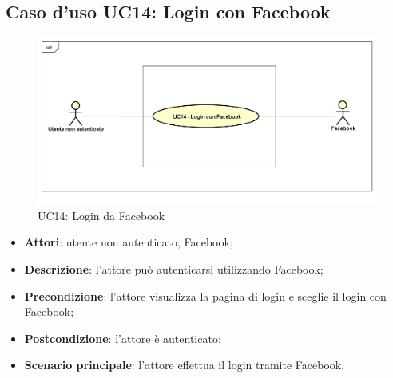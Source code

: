 \newpage
\subsection{Caso d'uso UC14: Login con Facebook}
\label{UC14}
\begin{figure}
	\centering
	\includegraphics[scale=0.48]{UML/UC14.png}
	\caption{UC14: Login da Facebook}
\end{figure}
\FloatBarrier
\begin{itemize}
	\item \textbf{Attori}: utente non autenticato, Facebook;
	\item \textbf{Descrizione}: l'attore può autenticarsi utilizzando Facebook;
	\item \textbf{Precondizione}: l'attore visualizza la pagina di login e sceglie il login con Facebook;
	\item \textbf{Postcondizione}: l'attore è autenticato;
	\item \textbf{Scenario principale}: l'attore effettua il login tramite Facebook.
\end{itemize}
